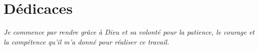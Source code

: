 \chapter*{\Huge Dédicaces}

\vspace{5cm}
\textit{\Large Je commence par rendre grâce à Dieu et sa volonté pour la patience, le courage et la compétence qu’il m’a donné pour   réaliser ce travail.}
















\begingroup
    \large \raggedright 
    \vspace{6mm}
    

    
    \vspace{6mm}
   
\endgroup

\vspace{10cm}
\begin{flushright}
    \LARGE \@author
\end{flushright}